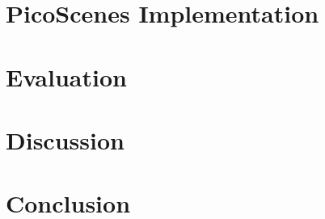 \documentclass{sig-alternate-10pt}
\begin{document}
\section{PicoScenes Implementation} %
\label{sec:picoscenes_implementation}


\section{Evaluation} %
\label{sec:evaluation}


\section{Discussion} %
\label{sec:discussion}


\section{Conclusion} %
\label{sec:conclusion}




\end{document}
